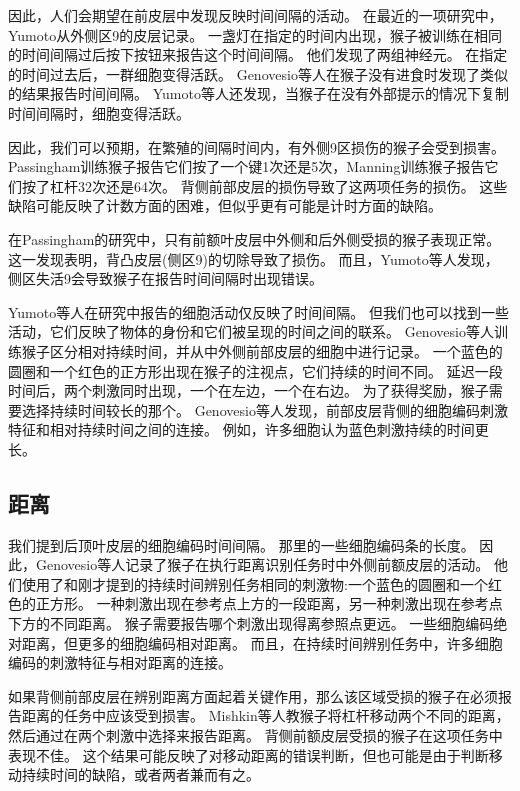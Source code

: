 因此，人们会期望在前皮层中发现反映时间间隔的活动。
在最近的一项研究中，Yumoto\cite{yumoto2011neural}从外侧区9的皮层记录。
一盏灯在指定的时间内出现，猴子被训练在相同的时间间隔过后按下按钮来报告这个时间间隔。
他们发现了两组神经元。
在指定的时间过去后，一群细胞变得活跃。
Genovesio等人\cite{genovesio2006neuronal}在猴子没有进食时发现了类似的结果报告时间间隔。
Yumoto等人还发现，当猴子在没有外部提示的情况下复制时间间隔时，细胞变得活跃。


因此，我们可以预期，在繁殖的间隔时间内，有外侧9区损伤的猴子会受到损害。
Passingham\cite{passingham1978information}训练猴子报告它们按了一个键1次还是5次，Manning\cite{manning1978dorsolateral}训练猴子报告它们按了杠杆32次还是64次。
背侧前部皮层的损伤导致了这两项任务的损伤。
这些缺陷可能反映了计数方面的困难，但似乎更有可能是计时方面的缺陷。


在Passingham\cite{passingham1978information}的研究中，只有前额叶皮层中外侧和后外侧受损的猴子表现正常。
这一发现表明，背凸皮层(侧区9)的切除导致了损伤。
而且，Yumoto等人\cite{yumoto2011neural}发现，侧区失活9会导致猴子在报告时间间隔时出现错误。


Yumoto等人在研究中报告的细胞活动仅反映了时间间隔。
但我们也可以找到一些活动，它们反映了物体的身份和它们被呈现的时间之间的联系。
Genovesio等人\cite{genovesio2009feature}训练猴子区分相对持续时间，并从中外侧前部皮层的细胞中进行记录。
一个蓝色的圆圈和一个红色的正方形出现在猴子的注视点，它们持续的时间不同。
延迟一段时间后，两个刺激同时出现，一个在左边，一个在右边。
为了获得奖励，猴子需要选择持续时间较长的那个。
Genovesio等人发现，前部皮层背侧的细胞编码刺激特征和相对持续时间之间的连接。
例如，许多细胞认为蓝色刺激持续的时间更长。


\subsection{距离}

我们提到后顶叶皮层的细胞编码时间间隔\cite{leon2003representation}。
那里的一些细胞编码条的长度\cite{tudusciuc2007neuronal}。
因此，Genovesio等人\cite{genovesio2011prefrontal}记录了猴子在执行距离识别任务时中外侧前额皮层的活动。
他们使用了和刚才提到的持续时间辨别任务相同的刺激物:一个蓝色的圆圈和一个红色的正方形。
一种刺激出现在参考点上方的一段距离，另一种刺激出现在参考点下方的不同距离。
猴子需要报告哪个刺激出现得离参照点更远。
一些细胞编码绝对距离，但更多的细胞编码相对距离。
而且，在持续时间辨别任务中，许多细胞编码的刺激特征与相对距离的连接。


如果背侧前部皮层在辨别距离方面起着关键作用，那么该区域受损的猴子在必须报告距离的任务中应该受到损害。
Mishkin等人\cite{mishkin1977kinesthetic}教猴子将杠杆移动两个不同的距离，然后通过在两个刺激中选择来报告距离。
背侧前额皮层受损的猴子在这项任务中表现不佳。
这个结果可能反映了对移动距离的错误判断，但也可能是由于判断移动持续时间的缺陷，或者两者兼而有之。



